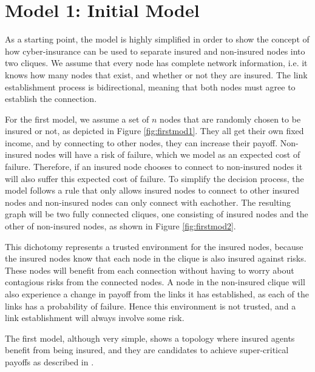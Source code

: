 \section{Model 1: Initial Model \label{section:verysimplemodel}}

As a starting point, the model is highly simplified in order to show the concept of how cyber-insurance can be used to separate insured and non-insured nodes into two cliques. We assume that every node has complete network information, i.e. it knows how many nodes that exist, and whether or not they are insured. The link establishment process is bidirectional, meaning that both nodes must agree to establish the connection.

For the first model, we assume a set of $n$ nodes that are randomly chosen to be insured or not, as depicted in Figure \ref{fig:firstmod1}. They all get their own fixed income, and by connecting to other nodes, they can increase their payoff. Non-insured nodes will have a risk of failure, which we model as an expected cost of failure. Therefore, if an insured node chooses to connect to non-insured nodes it will also suffer this expected cost of failure. To simplify the decision process, the model follows a rule that only allows insured nodes to connect to other insured nodes and non-insured nodes can only connect with eachother. The resulting graph will be two fully connected cliques, one consisting of insured nodes and the other of non-insured nodes, as shown in Figure  \ref{fig:firstmod2}. 

This dichotomy represents a trusted environment for the insured nodes, because the insured nodes know that each node in the clique is also insured against risks. These nodes will benefit from each connection without having to worry about contagious risks from the connected nodes. 
A node in the non-insured clique will also experience a change in payoff from the links it has established, as each of the links has a probability of failure. Hence this environment is not trusted, and a link establishment will always involve some risk. 

The first model, although very simple, shows a topology where insured agents benefit from being insured, and they are candidates to achieve super-critical payoffs as described in \cite{contagion}.

